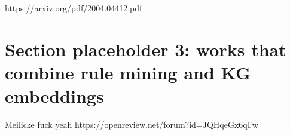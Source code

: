 https://arxiv.org/pdf/2004.04412.pdf

\section{Section placeholder 3: works that combine rule mining and KG embeddings}
Meilicke fuck yeah
https://openreview.net/forum?id=JQHqeGx6qFw